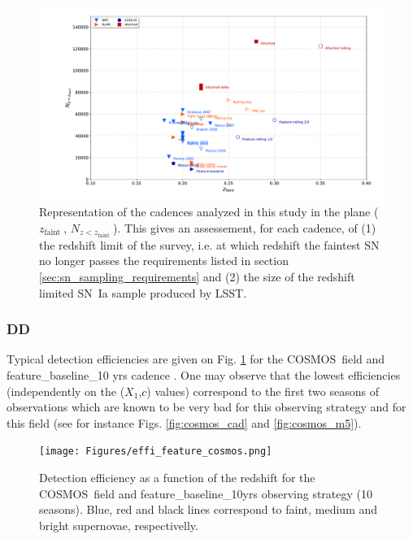 \documentclass [11pt,a4paper]{article}
\newcommand{\cosmos}{COSMOS}
\newcommand{\strech}{$X_1$}
\newcommand{\sncolor}{$c$}
\newcommand{\zfaint}{$z_{\mathrm{faint}}\ $}
\newcommand{\nsnfaint}{$N_{z<z_{\mathrm{faint}}}\ $}
\begin{document}
\begin{figure}
  \begin{center}
    \includegraphics[width=\linewidth]{Figures/summary_plot_wfd_faintsn.pdf}
    \caption{Representation of the cadences analyzed in this study in
      the plane (\zfaint, \nsnfaint). This gives an assessement, for
      each cadence, of (1) the redshift limit of the survey, i.e. at
      which redshift the faintest SN no longer passes the requirements
      listed in section \ref{sec:sn_sampling_requirements} and (2) the
      size of the redshift limited SN~Ia sample produced by LSST.}
  \end{center}
\end{figure}

\subsubsection{ DD}

Typical detection efficiencies are given on Fig. \ref{fig:effi} for the \cosmos~field and feature\_baseline\_10 yrs cadence . One may observe that the lowest efficiencies (independently on the (\strech,\sncolor) values) correspond to the first two seasons of observations which are known to be very bad for this observing strategy and for this field (see for instance Figs. \ref{fig:cosmos_cad} and \ref{fig:cosmos_m5}).

\begin{figure}[htbp]
\begin{center}
  
  \texttt{[image: Figures/effi\_feature\_cosmos.png]}
 \caption{Detection efficiency as a function of the redshift for the \cosmos~field and feature\_baseline\_10yrs observing strategy (10 seasons). Blue, red and black lines correspond to faint, medium and bright supernovae, respectivelly.}\label{fig:effi}
\end{center}
\end{figure}
\end{document}
